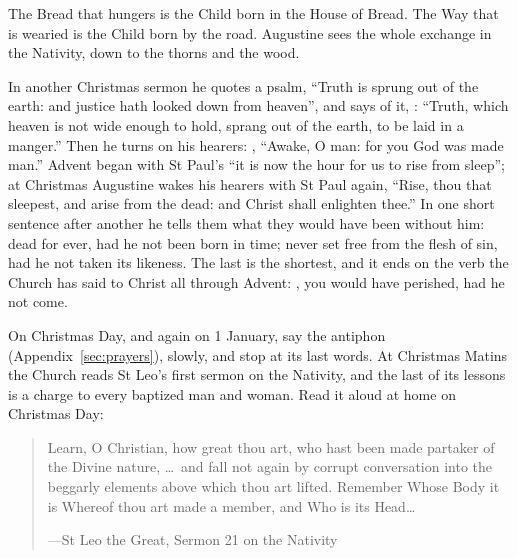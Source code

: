 The Bread that hungers is the Child born in the House of Bread. The Way that is
wearied is the Child born by the road. Augustine sees the whole exchange in the
Nativity, down to the thorns and the wood.

In another Christmas sermon he quotes a psalm, ``Truth is sprung out of the
earth: and justice hath looked down from heaven'', and says of it,
: ``Truth, which heaven is not wide enough to hold, sprang out of the
earth, to be laid in a manger.'' Then he turns on his hearers:
, ``Awake, O man: for you
God was made man.'' Advent began with St Paul's ``it is now the hour for us to
rise from sleep''; at Christmas Augustine wakes his hearers with St Paul again,
``Rise, thou that sleepest, and arise from the dead: and Christ shall enlighten
thee.'' In one short sentence after another he tells them what they would
have been without him: dead for ever, had he not been born in time; never set
free from the flesh of sin, had he not taken its likeness. The last is the
shortest, and it ends on the verb the Church has said to Christ all through
Advent: , you would have perished, had he not
come.

On Christmas Day, and again on 1 January, say the antiphon  (Appendix~\ref{sec:prayers}), slowly, and stop at its last words.
At Christmas Matins the Church reads St Leo's first sermon on the Nativity, and
the last of its lessons is a charge to every baptized man and woman. Read it aloud at home on
Christmas Day:

\begin{quote}
Learn, O Christian, how great thou art, who hast been made partaker of the
Divine nature, \dots\ and fall not again by corrupt conversation into the
beggarly elements above which thou art lifted. Remember Whose Body it is
Whereof thou art made a member, and Who is its Head\dots\par
{\smallskip\noindent\small ---St Leo the Great, Sermon 21 on the Nativity\par}
\end{quote}
